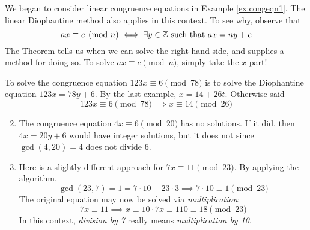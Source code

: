 




We began to consider linear congruence equations in Example \ref{ex:congeqn1}. The linear Diophantine method also applies in this context. To see why, observe that
\[
	ax\equiv c\pmod n\iff \exists y\in\mathbb{Z}\text{ such that }ax=ny+c
\]
The Theorem tells us when we can solve the right hand side, and supplies a method for doing so. To solve $ax\equiv c\pmod n$, simply take the $x$-part!

\begin{examples}{}{}
	\exstart To solve the congruence equation $123x\equiv 6\pmod{78}$ is to solve the Diophantine equation $123x=78y+6$. By the last example, $x=14+26t$. Otherwise said
	\[
		123x\equiv 6\pmod{78} \implies x\equiv 14\pmod{26}
	\]
	
	\begin{enumerate}\setcounter{enumi}{1}
	  \item The congruence equation $4x\equiv 6\pmod{20}$ has no solutions. If it did, then $4x=20y+6$ would have integer solutions, but it does not since $\gcd(4,20)=4$ does not divide 6. 
	  
	  \item Here is a slightly different approach for $7x\equiv 11\pmod{23}$. By applying the algorithm,
		\[
			\gcd(23,7)=1=7\cdot 10-23\cdot 3 \implies 7\cdot 10\equiv 1\pmod{23}
		\]
		The original equation may now be solved via \emph{multiplication}:
		\[
			7x\equiv 11 \implies x\equiv 10\cdot 7x\equiv 110\equiv 18\pmod{23}
		\]
		In this context, \emph{division by 7} really means \emph{multiplication\footnotemark{} by 10}.
	\end{enumerate}
\end{examples}


